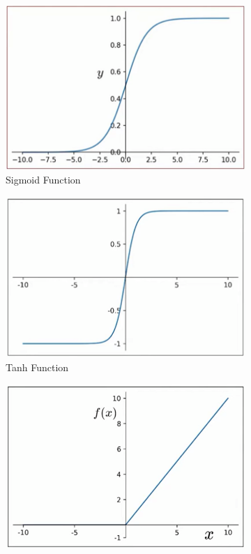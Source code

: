 \documentclass[a4paper]{article}
\begin{document}
\begin{itemize}
\begin{figure}[H]
\begin{subfigure}[b]{0.3\textwidth}
            \centering
            \includegraphics[width=\textwidth]{Degree/static/DL_Sigmoid_function.png}
            \caption{Sigmoid Function}
        \end{subfigure}
        \hfill
        \begin{subfigure}[b]{0.3\textwidth}
            \centering
            \includegraphics[width=\textwidth]{Degree/static/DL_tanh_function.png}
            \caption{Tanh Function}
        \end{subfigure}
        \hfill
        \begin{subfigure}[b]{0.3\textwidth}
            \centering
            \includegraphics[width=\textwidth]{Degree/static/DL_ReLU_function.png}

\end{subfigure}
\end{figure}
\end{itemize}
\end{document}
